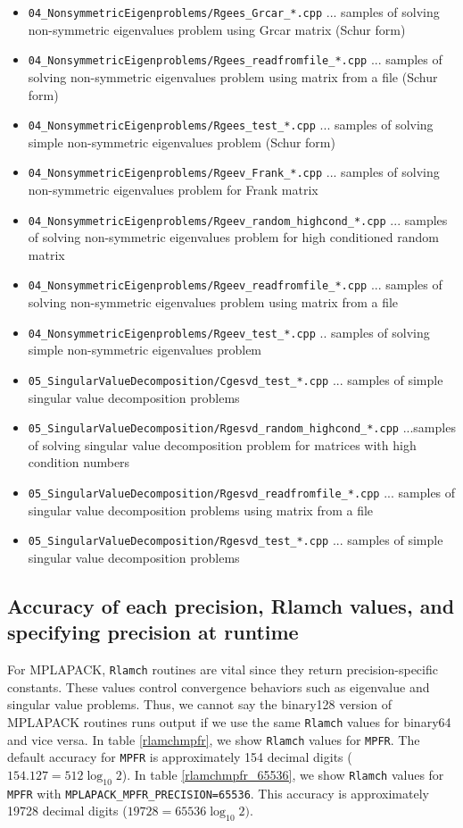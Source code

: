 \documentclass[12pt]{article}
\begin{document}
\begin{itemize}
\item {\tt 04\_NonsymmetricEigenproblems/Rgees\_Grcar\_*.cpp} ... samples of solving non-symmetric eigenvalues problem using Grcar matrix (Schur form)
\item {\tt 04\_NonsymmetricEigenproblems/Rgees\_readfromfile\_*.cpp} ... samples of solving non-symmetric eigenvalues problem using matrix from a file (Schur form)
\item {\tt 04\_NonsymmetricEigenproblems/Rgees\_test\_*.cpp} ... samples of solving simple non-symmetric eigenvalues problem (Schur form)
\item {\tt 04\_NonsymmetricEigenproblems/Rgeev\_Frank\_*.cpp} ... samples of solving non-symmetric eigenvalues problem for Frank matrix
\item {\tt 04\_NonsymmetricEigenproblems/Rgeev\_random\_highcond\_*.cpp}  ... samples of solving non-symmetric eigenvalues problem for high conditioned random matrix
\item {\tt 04\_NonsymmetricEigenproblems/Rgeev\_readfromfile\_*.cpp} ... samples of solving non-symmetric eigenvalues problem using matrix from a file
\item {\tt 04\_NonsymmetricEigenproblems/Rgeev\_test\_*.cpp} .. samples of solving simple non-symmetric eigenvalues problem
\item {\tt 05\_SingularValueDecomposition/Cgesvd\_test\_*.cpp} ... samples of simple singular value decomposition problems
\item {\tt 05\_SingularValueDecomposition/Rgesvd\_random\_highcond\_*.cpp} ...samples of solving singular value decomposition problem for matrices with high condition numbers
\item {\tt 05\_SingularValueDecomposition/Rgesvd\_readfromfile\_*.cpp} ... samples of singular value decomposition problems using matrix from a file
\item {\tt 05\_SingularValueDecomposition/Rgesvd\_test\_*.cpp} ... samples of simple singular value decomposition problems
\end{itemize}


\subsection{Accuracy of each precision, Rlamch values, and specifying precision at runtime}
For MPLAPACK, {\tt Rlamch} routines are vital since they return precision-specific constants. These values control convergence behaviors such as eigenvalue and singular value problems. Thus, we cannot say the binary128 version of MPLAPACK routines runs output if we use the same {\tt Rlamch} values for binary64 and vice versa.
In table \ref{rlamchmpfr}, we show {\tt Rlamch} values for {\tt MPFR}. The default accuracy for {\tt MPFR} is approximately 154 decimal digits ($154.127 =512 \log_{10}2$).
In table \ref{rlamchmpfr_65536}, we show {\tt Rlamch} values for {\tt MPFR} with {\tt MPLAPACK\_MPFR\_PRECISION=65536}. This accuracy is approximately 19728 decimal digits ($19728 = 65536 \log_{10}2)$.
\end{document}
